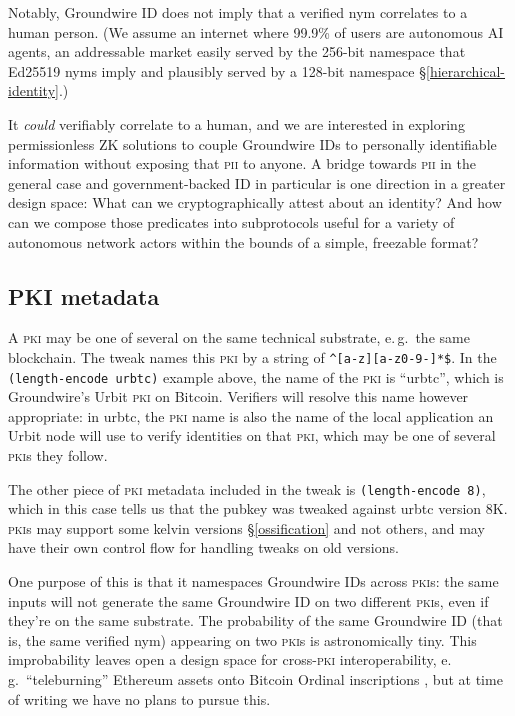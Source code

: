 \documentclass[twoside]{article}
\begin{document}
Notably, Groundwire ID does not imply that a verified nym correlates to
a human person. (We assume an internet where 99.9\% of users are
autonomous AI agents, an addressable market easily served by the 256-bit
namespace that Ed25519 nyms imply and plausibly served by a 128-bit
namespace \S\ref{hierarchical-identity}.)

It \emph{could} verifiably correlate to a human, and we are interested
in exploring permissionless ZK solutions to couple Groundwire IDs to personally identifiable information
without exposing that \textsc{pii} to anyone. A bridge towards \textsc{pii} in the general
case and government-backed ID in particular is one direction in a
greater design space: What can we cryptographically attest about an
identity? And how can we compose those predicates into subprotocols
useful for a variety of autonomous network actors within the bounds of a
simple, freezable format?

\subsection[\textsc{pki} metadata]{PKI metadata}\label{pki-metadata}

A \textsc{pki} may be one of several on the same technical substrate, e.\,g.\ the
same blockchain. The tweak names this \textsc{pki} by a string of
\texttt{\^{}{[}a-z{]}{[}a-z0-9-{]}*\$}. In the
\texttt{(length-encode\ \textquotesingle{}urbtc\textquotesingle{})}
example above, the name of the \textsc{pki} is ``urbtc'', which is Groundwire's
Urbit \textsc{pki} on Bitcoin. Verifiers will resolve this name however
appropriate: in urbtc, the \textsc{pki} name is also the name of the local
application an Urbit node will use to verify identities on that \textsc{pki}, which may
be one of several \textsc{pki}s they follow.

The other piece of \textsc{pki} metadata included in the tweak is
\texttt{(length-encode\ 8)}, which in this case tells us that the pubkey
was tweaked against urbtc version 8K. \textsc{pki}s may support some kelvin
versions \S\ref{ossification} and not others, and may have their own control flow for
handling tweaks on old versions.

One purpose of this is that it namespaces Groundwire IDs across \textsc{pki}s:
the same inputs will not generate the same Groundwire ID on two
different \textsc{pki}s, even if they're on the same substrate. The probability
of the same Groundwire ID (that is, the same verified nym) appearing on two
\textsc{pki}s is astronomically tiny. This improbability leaves open a design
space for cross-\textsc{pki} interoperability, e.\,g.\ ``teleburning'' Ethereum
assets onto Bitcoin Ordinal inscriptions \citep{Rodarmor2026Teleburning}, but at time of
writing we have no plans to pursue this.
\end{document}
